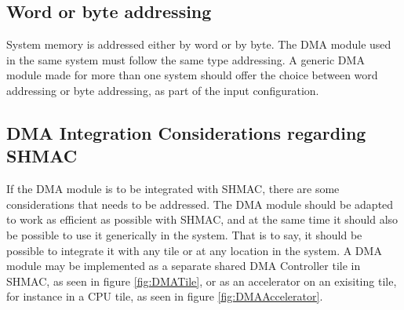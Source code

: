 %

\subsection{Word or byte addressing}
System memory is addressed either by word or by byte.
The DMA module used in the same system must follow the same type addressing.
A generic DMA module made for more than one system should offer the choice between word addressing or byte addressing, as part of the input configuration.

\subsection{DMA Integration Considerations regarding SHMAC}
\label{sec:DMA-SHMAC}
If the DMA module is to be integrated with SHMAC, there are some considerations that needs to be addressed.
The DMA module should be adapted to work as efficient as possible with SHMAC, and at the same time it should also be possible to use it generically in the system.
That is to say, it should be possible to integrate it with any tile or at any location in the system.
A DMA module may be implemented as a separate shared DMA Controller tile in SHMAC, as seen in figure \ref{fig:DMATile}, or as an accelerator on an exisiting tile, for instance in a CPU tile, as seen in figure \ref{fig:DMAAccelerator}.

